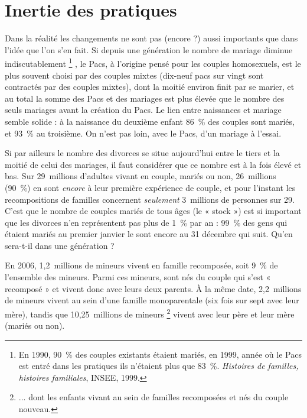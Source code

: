 

\chapter{Inertie des pratiques}


 Dans la réalité les changements ne sont pas (encore ?) aussi importants que dans l'idée que l'on s'en fait. Si depuis une génération le nombre de mariage diminue indiscutablement%
\footnote{En 1990, 90~\% des couples existants étaient mariés, en 1999, année où le Pacs est entré dans les pratiques ils n'étaient plus que 83~\%. \emph{Histoires de familles, histoires familiales}, INSEE, 1999.}%
, le Pacs, à l'origine pensé pour les couples homosexuels, est le plus souvent choisi par des couples mixtes (dix-neuf pacs sur vingt sont contractés par des couples mixtes), dont la moitié environ finit par se marier, et au total la somme des Pacs et des mariages est plus élevée que le nombre des seuls mariages avant la création du Pacs. Le lien entre naissances et mariage semble solide : à la naissance du deuxième enfant 86~\% des couples sont mariés, et 93~\% au troisième. On n'est pas loin, avec le Pacs, d'un mariage à l'essai.

 Si par ailleurs le nombre des divorces se situe aujourd'hui entre le tiers et la moitié de celui des mariages, il faut considérer que ce nombre est à la fois élevé et bas. Sur 29~millions d'adultes vivant en couple, mariés ou non, 26~millions (90~\%) en sont \emph{encore} à leur première expérience de couple, et pour l'instant les recompositions de familles concernent \emph{seulement} 3~millions de personnes sur 29. C'est que le nombre de couples mariés de tous âges (le « stock ») est si important que les divorces n'en représentent pas plus de 1~\% par an : 99~\% des gens qui étaient mariés au premier janvier le sont encore au 31 décembre qui suit. Qu'en sera-t-il dans une génération ?

 En 2006, 1,2~millions de mineurs vivent en famille recomposée, soit 9~\% de l'ensemble des mineurs. Parmi ces mineurs,  sont nés du couple qui s'est « recomposé » et vivent donc avec leurs deux parents. À la même date, 2,2~millions de mineurs vivent au sein d'une famille monoparentale (six fois sur sept avec leur mère), tandis que 10,25~millions de mineurs%
\footnote{... dont les  enfants vivant au sein de familles recomposées et nés du couple nouveau.} 
vivent avec leur père et leur mère (mariés ou non). 
 



